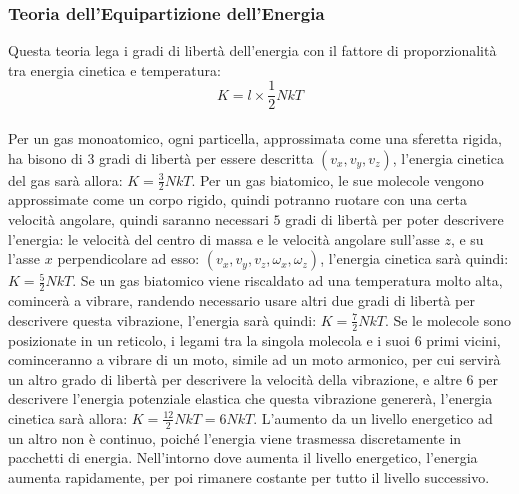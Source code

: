 \documentclass{article}
\numberwithin{equation}{subsection}
\begin{document}
\subsubsection{Teoria dell'Equipartizione dell'Energia}
Questa teoria lega i gradi di libertà dell'energia con 
il fattore di proporzionalità tra energia cinetica e 
temperatura:
\begin{equation}
    K=l\times\frac{1}{2}NkT
\end{equation} \\
Per un gas monoatomico, ogni particella, approssimata come 
una sferetta rigida, ha bisono di $3$ gradi di libertà per 
essere descritta $(v_x, v_y,v_z)$, l'energia cinetica 
del gas sarà allora: $K=\displaystyle\frac{3}{2}NkT$. 
Per un gas biatomico, le sue molecole vengono approssimate 
come un corpo rigido, quindi potranno ruotare con una certa 
velocità angolare, quindi saranno necessari $5$ gradi di 
libertà per poter descrivere l'energia: le velocità del 
centro di massa e le velocità angolare sull'asse $z$, e su 
l'asse $x$ perpendicolare ad esso: 
$(v_x,v_y,v_z,\omega_x,\omega_z)$, l'energia cinetica 
sarà quindi: $K=\displaystyle\frac{5}{2}NkT$. 
Se un gas biatomico viene riscaldato ad una temperatura molto 
alta, comincerà a vibrare, randendo necessario usare altri due 
gradi di libertà per descrivere questa vibrazione, l'energia 
sarà quindi: $K=\displaystyle\frac{7}{2}NkT$. 
Se le molecole sono posizionate in un reticolo, i legami tra la singola 
molecola e i suoi $6$ primi vicini, cominceranno a 
vibrare di un moto, simile ad un moto armonico, per 
cui servirà un altro grado di libertà per descrivere 
la velocità della vibrazione, e altre $6$ per descrivere 
l'energia potenziale elastica che questa vibrazione genererà, 
l'energia cinetica sarà allora: $K=\displaystyle\frac{12}{2}NkT=6NkT$. 
L'aumento da un livello energetico ad un altro non è 
continuo, poiché l'energia viene trasmessa discretamente in 
pacchetti di energia. Nell'intorno dove aumenta il livello 
energetico, l'energia aumenta rapidamente, per poi 
rimanere costante per tutto il livello successivo. 
\begin{center}\end{center}
\end{document}
